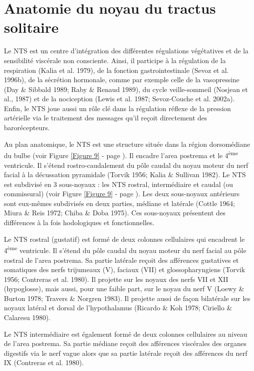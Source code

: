 \documentclass[a4paper,12pt,twoside]{report}
\begin{document}
\section{Anatomie du noyau du tractus solitaire}

Le NTS est un centre d’intégration des différentes régulations végétatives et de la sensibilité viscérale non consciente. Ainsi, il participe à la régulation de la respiration (Kalia et al. 1979), de la fonction gastrointestinale (Sevoz et al. 1996b), de la sécrétion hormonale, comme par exemple celle de la vasopressine (Day \& Sibbald 1989; Raby \& Renaud 1989), du cycle veille-sommeil (Nosjean et al., 1987) et de la nociception (Lewis et al. 1987; Sevoz-Couche et al. 2002a). Enfin, le NTS joue aussi un rôle clé dans la régulation réflexe de la pression artérielle via le traitement des messages qu’il reçoit directement des barorécepteurs. 

Au plan anatomique, le NTS est une structure située dans la région dorsomédiane du bulbe (voir Figure \ref{Figure 9} - page \pageref{Figure 9}). Il encadre l’area postrema et le 4\textsuperscript{ème} ventricule. Il s’étend rostro-caudalement du pôle caudal du noyau moteur du nerf facial à la décussation pyramidale (Torvik 1956; Kalia \& Sullivan 1982). Le NTS est subdivisé en 3 sous-noyaux : les NTS rostral, intermédiaire et caudal (ou commissural) (voir Figure \ref{Figure 9} - page \pageref{Figure 9}). Les deux sous-noyaux antérieurs sont eux-mêmes subdivisés en deux parties, médiane et latérale (Cottle 1964; Miura \& Reis 1972; Chiba \& Doba 1975). Ces sous-noyaux présentent des différences à la fois hodologiques et fonctionnelles.

Le NTS rostral (gustatif) est formé de deux colonnes cellulaires qui encadrent le 4\textsuperscript{ème} ventricule. Il s’étend du pôle caudal du noyau moteur du nerf facial au pôle rostral de l’area postrema. Sa partie latérale reçoit des afférences gustatives et somatiques des nerfs trijumeaux (V), faciaux (VII) et glossopharyngiens (Torvik 1956; Contreras et al. 1980). Il projette sur les noyaux des nerfs VII et XII (hypoglosse), mais aussi, pour une faible part, sur le noyau du nerf V (Loewy \& Burton 1978; Travers \& Norgren 1983). Il projette aussi de façon bilatérale sur les noyaux latéral et dorsal de l’hypothalamus (Ricardo \& Koh 1978; Ciriello \& Calaresu 1980).

Le NTS intermédiaire est également formé de deux colonnes cellulaires au niveau de l’area postrema. Sa partie médiane reçoit des afférences viscérales des organes digestifs via le nerf vague alors que sa partie latérale reçoit des afférences du nerf IX (Contreras et al. 1980).
\end{document}
